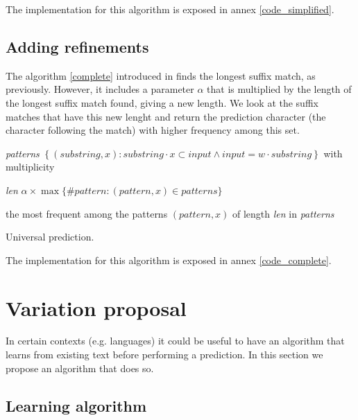 \documentclass[a4paper,12pt]{article}
\begin{document}
    The implementation for this algorithm is exposed in annex \ref{code_simplified}.


  \subsection{Adding refinements}

  The algorithm \ref{complete} introduced in \cite{paper} finds the longest suffix match, as previously. However, it includes a parameter $\alpha$ that is multiplied by the length of the longest suffix match found, giving a new length. We look at the suffix matches that have this new lenght and return the prediction character (the character following the match) with higher frequency among this set.

    \begin{algorithm}

      \textit{patterns} \gets{}
        $\left\{ (\textit{substring},x) :%
        \textit{substring}\cdot x\subset\textit{input} \wedge
        \textit{input} = w\cdot\textit{substring} \right\}$
        with multiplicity\;

      \textit{len} \gets{} $\alpha\times\max\{\#\textit{pattern} :
        (\textit{pattern},x)\in\textit{patterns}\}$\;

       the most frequent among the patterns $(\textit{pattern},x)$
        of length \textit{len} in \textit{patterns}\;

      \caption{\label{complete}Universal prediction.}
    \end{algorithm}

    The implementation for this algorithm is exposed in annex \ref{code_complete}.

    \section{Variation proposal}\label{variation_algo}

    In certain contexts (e.g. languages) it could be useful to have an algorithm that learns from existing text  before performing a prediction. In this section we propose an algorithm that does so.
  
  \subsection{Learning algorithm}
\end{document}
